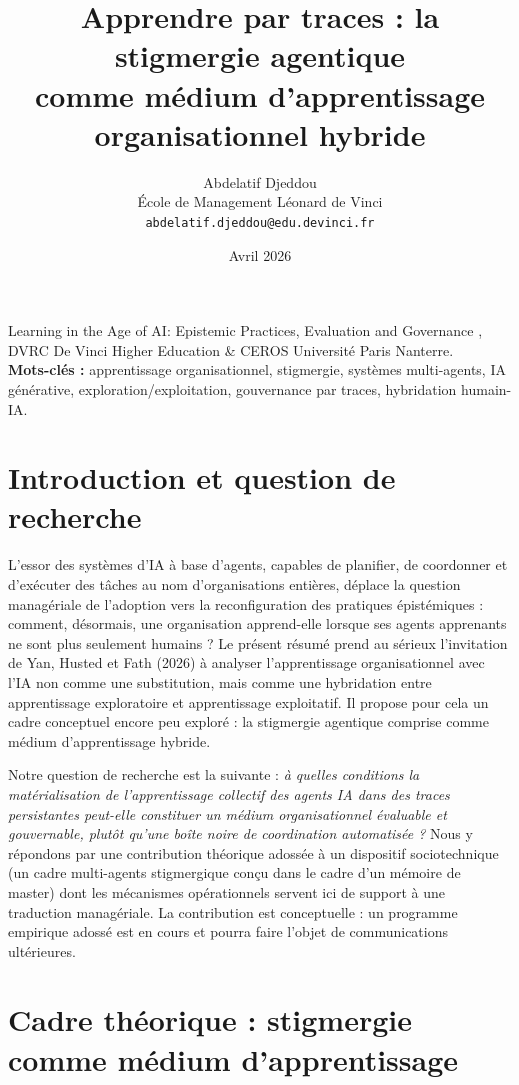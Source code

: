 \documentclass[12pt,a4paper]{article}
\title{\textbf{Apprendre par traces : la stigmergie agentique\\
comme médium d'apprentissage organisationnel hybride}}
\author{Abdelatif Djeddou\\
\small École de Management Léonard de Vinci\\
\small \texttt{abdelatif.djeddou@edu.devinci.fr}}
\date{Avril 2026}
\begin{document}
\maketitle

\begin{flushleft}
Learning in the Age of AI: Epistemic Practices, Evaluation and Governance \fg{}, DVRC De Vinci Higher Education \& CEROS Université Paris Nanterre.\\[0.3em]
\textbf{Mots-clés :} apprentissage organisationnel, stigmergie, systèmes multi-agents, IA générative, exploration/exploitation, gouvernance par traces, hybridation humain-IA.
\end{flushleft}

\hrulefill

\section{Introduction et question de recherche}

L'essor des systèmes d'IA à base d'agents, capables de planifier, de coordonner et d'exécuter des tâches au nom d'organisations entières, déplace la question managériale de l'adoption vers la reconfiguration des pratiques épistémiques : comment, désormais, une organisation apprend-elle lorsque ses agents apprenants ne sont plus seulement humains ? Le présent résumé prend au sérieux l'invitation de Yan, Husted et Fath (2026) à analyser l'apprentissage organisationnel avec l'IA non comme une substitution, mais comme une hybridation entre apprentissage exploratoire et apprentissage exploitatif. Il propose pour cela un cadre conceptuel encore peu exploré : la stigmergie agentique comprise comme médium d'apprentissage hybride.

Notre question de recherche est la suivante : \textit{à quelles conditions la matérialisation de l'apprentissage collectif des agents IA dans des traces persistantes peut-elle constituer un médium organisationnel évaluable et gouvernable, plutôt qu'une boîte noire de coordination automatisée ?} Nous y répondons par une contribution théorique adossée à un dispositif sociotechnique (un cadre multi-agents stigmergique conçu dans le cadre d'un mémoire de master) dont les mécanismes opérationnels servent ici de support à une traduction managériale. La contribution est conceptuelle : un programme empirique adossé est en cours et pourra faire l'objet de communications ultérieures.

\section{Cadre théorique : stigmergie comme médium d'apprentissage}
\end{document}
